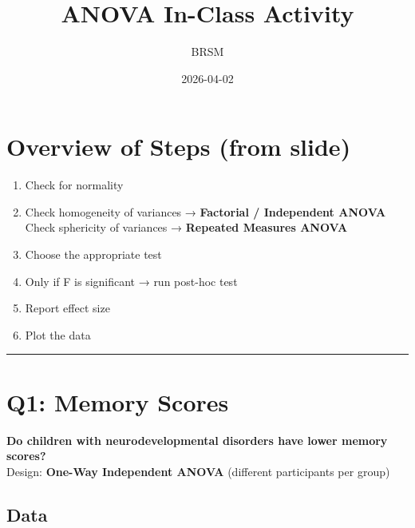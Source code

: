 \documentclass[
]{article}
\title{ANOVA In-Class Activity}
\author{BRSM}
\date{2026-04-02}
\providecommand{\tightlist}{%
  \setlength{\itemsep}{0pt}\setlength{\parskip}{0pt}}
\begin{document}
\maketitle

{
\setcounter{tocdepth}{2}
\tableofcontents
}
\section{Overview of Steps (from
slide)}\label{overview-of-steps-from-slide}

\begin{enumerate}
\def\labelenumi{\arabic{enumi}.}
\tightlist
\item
  Check for normality\\
\item
  Check homogeneity of variances → \textbf{Factorial / Independent
  ANOVA}\\
  Check sphericity of variances → \textbf{Repeated Measures ANOVA}\\
\item
  Choose the appropriate test\\
\item
  Only if F is significant → run post-hoc test\\
\item
  Report effect size\\
\item
  Plot the data
\end{enumerate}

\begin{center}\rule{0.5\linewidth}{0.5pt}\end{center}

\section{Q1: Memory Scores}\label{q1-memory-scores}

\textbf{Do children with neurodevelopmental disorders have lower memory
scores?}\\
Design: \textbf{One-Way Independent ANOVA} (different participants per
group)

\subsection{Data}\label{data}
\end{document}
